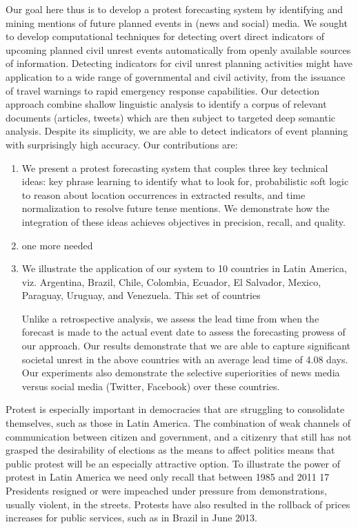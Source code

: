 Our goal here thus is to develop a protest forecasting system by identifying and mining mentions of future planned events
in (news and social) media.
We sought to develop
computational techniques for detecting overt direct indicators
of upcoming planned civil unrest events automatically from openly
available sources of information.  Detecting indicators for civil
unrest planning activities might have application to a wide range of
governmental and civil activity, from the issuance of travel warnings
to rapid emergency response capabilities.  
Our detection approach 
combine shallow linguistic analysis to identify a corpus of relevant
documents (articles, tweets) which are then subject to targeted deep semantic analysis.
Despite its simplicity, we are able to
detect indicators of event planning with surprisingly high
accuracy. 
Our contributions are:
\begin{enumerate}
\item We present a protest forecasting system that couples three key technical ideas:
key phrase learning to identify what to look for, probabilistic soft logic to reason about location occurrences in extracted results, and 
time normalization to resolve future tense mentions. We demonstrate how the integration of these ideas achieves objectives in precision,
recall, and quality.
\item one more needed
\item We illustrate the application of our system to 10 countries in Latin America, viz. Argentina, Brazil, Chile, Colombia, Ecuador, El Salvador, Mexico, Paraguay, Uruguay, and Venezuela. This set of countries

Unlike a retrospective analysis, we assess the lead time from when the forecast is made to
the actual event date to assess the forecasting prowess of our approach. Our results demonstrate that we are able to 
capture significant societal unrest in the above countries with an average lead time of 4.08 days. Our experiments also
demonstrate the selective superiorities of news media versus social media (Twitter, Facebook) over these countries.
\end{enumerate}



Protest is especially important in democracies that are struggling to consolidate themselves, such as those in Latin America. The combination of weak channels of communication between citizen and government, and a citizenry that still has not grasped the desirability of elections as the means to affect politics means that public protest will be an especially attractive option. To illustrate the power of protest in Latin America we need only recall that between 1985 and 2011 17 Presidents resigned or were impeached under pressure from demonstrations, usually violent, in the streets. Protests have also resulted in the rollback of prices increases for public services, such as in Brazil in June 2013.


